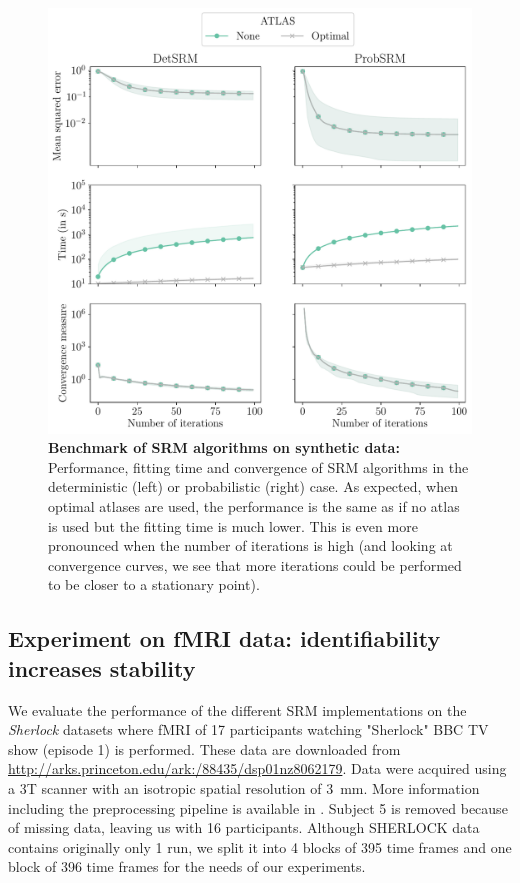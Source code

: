 \documentclass{article}
\begin{document}
\begin{figure}
  \centering
  \includegraphics[width=\textwidth]{../figures/synthetic_gradient.pdf}
  \caption{\textbf{Benchmark of SRM algorithms on synthetic data: } Performance,
    fitting time and convergence of SRM algorithms in the deterministic (left)
    or probabilistic (right) case.
    As expected, when optimal atlases are used,
    the performance is the same as if no atlas is used but the fitting time is
    much lower.
    This is even more pronounced when the number of iterations is
    high (and looking at convergence curves, we see that more iterations could
    be performed to be closer to a stationary point).
  }
  \label{fig:srm:synthetic_gradient}
\end{figure}

\subsection{Experiment on fMRI data: identifiability increases stability}
We evaluate the performance of the different SRM implementations on the
\emph{Sherlock} datasets where fMRI of 17 participants watching "Sherlock" BBC
TV show (episode 1) is performed.
%
% 
These data are downloaded from
\url{http://arks.princeton.edu/ark:/88435/dsp01nz8062179}.
%
% 
Data were acquired using a 3T scanner with an isotropic spatial resolution of
3~mm.
%
% 
More information including the preprocessing pipeline is available in
\cite{sherlock}.
%
% 
Subject 5 is removed because of missing data, leaving us with 16 participants.
%
% 
Although SHERLOCK data contains originally only 1 run, we split it into 4 blocks
of 395 time frames and one block of 396 time frames for the needs of our
experiments.
%
\end{document}

